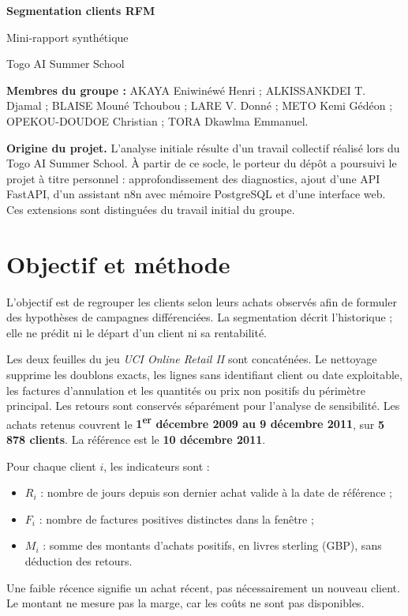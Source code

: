 \documentclass[11pt,a4paper]{article}
\begin{document}
\begin{center}
{\LARGE\bfseries Segmentation clients RFM}\par
{\large Mini-rapport synthétique}\par
{\color{rfmgreen}Togo AI Summer School}\par
\end{center}

\textbf{Membres du groupe :} AKAYA Eniwinéwé Henri ; ALKISSANKDEI T. Djamal ;
BLAISE Mouné Tchoubou ; LARE V. Donné ; METO Kemi Gédéon ;
OPEKOU-DOUDOE Christian ; TORA Dkawlma Emmanuel.

\textbf{Origine du projet.} L'analyse initiale résulte d'un travail collectif
réalisé lors du Togo AI Summer School. À partir de ce socle, le porteur du dépôt
a poursuivi le projet à titre personnel : approfondissement des diagnostics,
ajout d'une API FastAPI, d'un assistant n8n avec mémoire PostgreSQL et d'une
interface web. Ces extensions sont distinguées du travail initial du groupe.

\section{Objectif et méthode}
L'objectif est de regrouper les clients selon leurs achats observés afin de
formuler des hypothèses de campagnes différenciées. La segmentation décrit
l'historique ; elle ne prédit ni le départ d'un client ni sa rentabilité.

Les deux feuilles du jeu \textit{UCI Online Retail II} sont concaténées. Le
nettoyage supprime les doublons exacts, les lignes sans identifiant client ou
date exploitable, les factures d'annulation et les quantités ou prix non
positifs du périmètre principal. Les retours sont conservés séparément pour
l'analyse de sensibilité. Les achats retenus couvrent le
\textbf{1\textsuperscript{er} décembre 2009 au 9 décembre 2011}, sur
\textbf{5\,878 clients}. La référence est le \textbf{10 décembre 2011}.

Pour chaque client $i$, les indicateurs sont :
\begin{itemize}
\item $R_i$ : nombre de jours depuis son dernier achat valide à la date de référence ;
\item $F_i$ : nombre de factures positives distinctes dans la fenêtre ;
\item $M_i$ : somme des montants d'achats positifs, en livres sterling (GBP), sans déduction des retours.
\end{itemize}
Une faible récence signifie un achat récent, pas nécessairement un nouveau
client. Le montant ne mesure pas la marge, car les coûts ne sont pas disponibles.
\end{document}
